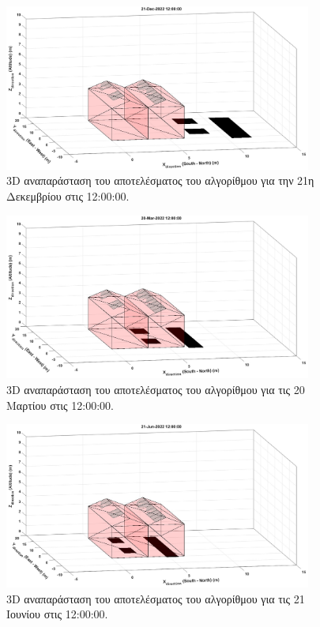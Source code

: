 \documentclass[12pt, a4paper]{report} %
\newcommand{\english}{\foreignlanguage{english}}
\begin{document}
\clearpage

\begin{figure}[H]%
    \centering
    \includegraphics[width=0.9\textwidth]{Figures/3D_dec.jpg}
    \caption{\english{3D} αναπαράσταση του αποτελέσματος του αλγορίθμου για την 21η Δεκεμβρίου στις 12:00:00.}
    \label{fig_3D_dec}
\end{figure}

\begin{figure}[H]%
    \centering
    \includegraphics[width=0.9\textwidth]{Figures/3D_mar.jpg}
    \caption{\english{3D} αναπαράσταση του αποτελέσματος του αλγορίθμου για τις 20 Μαρτίου στις 12:00:00.}
    \label{fig_3D_mar}
\end{figure}

\clearpage

\begin{figure}[H]%
    \centering
    \includegraphics[width=0.9\textwidth]{Figures/3D_jun.jpg}
    \caption{\english{3D} αναπαράσταση του αποτελέσματος του αλγορίθμου για τις 21 Ιουνίου στις 12:00:00.}
    \label{fig_3D_jun}
\end{figure}
\end{document}
